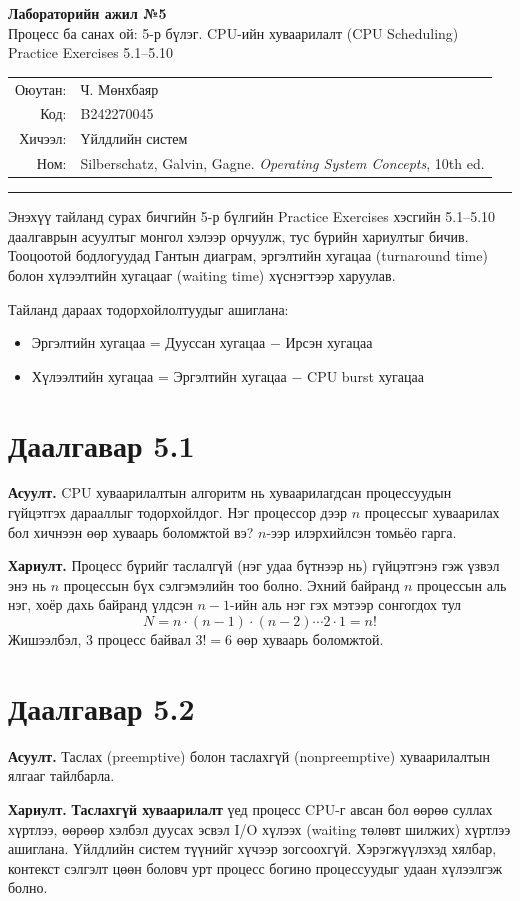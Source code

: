 \documentclass[12pt,a4paper]{article}
\newcommand{\q}[1]{\par\noindent\textbf{Асуулт.} #1\par}
\newcommand{\ans}{\par\noindent\textbf{Хариулт.} }
\begin{document}
\begin{center}
{\Large\bfseries Лабораторийн ажил №5}\\[4pt]
{\large Процесс ба санах ой: 5-р бүлэг. CPU-ийн хуваарилалт (CPU Scheduling)}\\[4pt]
Practice Exercises 5.1--5.10\\[10pt]
\begin{tabular}{rl}
Оюутан: & Ч. Мөнхбаяр \\
Код: & B242270045 \\
Хичээл: & Үйлдлийн систем \\
Ном: & Silberschatz, Galvin, Gagne. \textit{Operating System Concepts}, 10th ed.
\end{tabular}
\end{center}

\vspace{6pt}
\hrule
\vspace{6pt}

Энэхүү тайланд сурах бичгийн 5-р бүлгийн Practice Exercises хэсгийн 5.1--5.10 даалгаврын асуултыг монгол хэлээр орчуулж, тус бүрийн хариултыг бичив. Тооцоотой бодлогуудад Гантын диаграм, эргэлтийн хугацаа (turnaround time) болон хүлээлтийн хугацааг (waiting time) хүснэгтээр харуулав.

Тайланд дараах тодорхойлолтуудыг ашиглана:
\begin{itemize}[nosep]
\item Эргэлтийн хугацаа = Дууссан хугацаа $-$ Ирсэн хугацаа
\item Хүлээлтийн хугацаа = Эргэлтийн хугацаа $-$ CPU burst хугацаа
\end{itemize}

\section{Даалгавар 5.1}
\q{CPU хуваарилалтын алгоритм нь хуваарилагдсан процессуудын гүйцэтгэх дарааллыг тодорхойлдог. Нэг процессор дээр $n$ процессыг хуваарилах бол хичнээн өөр хуваарь боломжтой вэ? $n$-ээр илэрхийлсэн томьёо гарга.}
\ans Процесс бүрийг таслалгүй (нэг удаа бүтнээр нь) гүйцэтгэнэ гэж үзвэл энэ нь $n$ процессын бүх сэлгэмэлийн тоо болно. Эхний байранд $n$ процессын аль нэг, хоёр дахь байранд үлдсэн $n-1$-ийн аль нэг гэх мэтээр сонгогдох тул
\[
N = n \cdot (n-1) \cdot (n-2) \cdots 2 \cdot 1 = n!
\]
Жишээлбэл, 3 процесс байвал $3! = 6$ өөр хуваарь боломжтой.

\section{Даалгавар 5.2}
\q{Таслах (preemptive) болон таслахгүй (nonpreemptive) хуваарилалтын ялгааг тайлбарла.}
\ans
\textbf{Таслахгүй хуваарилалт} үед процесс CPU-г авсан бол өөрөө суллах хүртлээ, өөрөөр хэлбэл дуусах эсвэл I/O хүлээх (waiting төлөвт шилжих) хүртлээ ашиглана. Үйлдлийн систем түүнийг хүчээр зогсоохгүй. Хэрэгжүүлэхэд хялбар, контекст сэлгэлт цөөн боловч урт процесс богино процессуудыг удаан хүлээлгэж болно.
\end{document}
